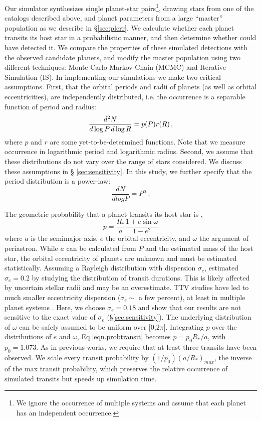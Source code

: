 Our simulator synthesizes single planet-star pairs\footnote{ We
  ignore the occurrence of multiple systems and assume that each
  planet has an independent occurrence.},  drawing stars from one of
the catalogs described above, and planet parameters from a large
``master'' population as we describe in \S \ref{sec:plerr}.  We calculate whether each
planet transits its host star in a probabilistic manner, and then determine
whether \kep{} could have detected it.  We compare the
properties of these simulated detections with the observed candidate \kep{}
planets, and modify the master population using two different
techniques: Monte Carlo Markov Chain (MCMC) and Iterative Simulation
(IS).  In implementing our simulations we make two critical
assumptions. First, that the orbital periods and radii of \kep{}
planets (as well as orbital eccentricities), are independently
distributed, i.e. the occurrence is a separable function of period and
radius:
\begin{equation}
{{d^2 N}\over{{d\log P \, d\log R}}} = p(P) r(R)\, ,
\label{eq:assumption}
\end{equation}
where $p$ and $r$ are some yet-to-be-determined functions. Note that
we measure occurrence in logarithmic period and logarithmic radius.
Second, we assume that these distributions do not vary over the range
of stars considered.  We discuss these assumptions in \S
\ref{sec:sensitivity}.  In this study, we further specify that the
  period distribution is a power-law:
\begin{equation}
\frac{dN}{d log P} = P^{\alpha}\, .
\label{eq:P}
\end{equation}


The geometric probability that a planet transits its host star is
\citep{Winn},
\begin{equation}
p = \frac{R_*}{a}\frac{1+e \sin \omega}{1-e^2}
\label{eqn.probtransit}
\end{equation}
where $a$ is the semimajor axis, $e$ the orbital eccentricity, and
$\omega$ the argument of periastron.  While $a$ can be calculated from
$P$ and the estimated mass of the host star, the orbital eccentricity
of \kep{} planets are unknown and must be estimated statistically.
Assuming a Rayleigh distribution with
  dispersion $\sigma_e$, \citet{Moorhead2011} estimated $\sigma_e =
0.2$ by studying the distribution of transit durations. This
  is likely affected by uncertain stellar radii and may be an
  overestimate. TTV studies have led to much smaller eccentricity
  dispersion ($\sigma_e \sim$ a few percent), at least in multiple
  planet systems \citep{WuLithwick,Hadden2014}. Here, we choose
$\sigma_e = 0.18$ and show that our results are not sensitive to the
exact value of $\sigma_e$ (\S \ref{sec:sensitivity}). 
The underlying distribution of $\omega$ can be safely assumed to be
uniform over [0,$2\pi$].  
Integrating $p$ over the distributions of $e$ and $\omega$,
Eq.\ref{eqn.probtransit} becomes $p = p_0 R_*/a$, with
$p_0=1.073$.  As in previous works, we require that at least three
transits have been observed. 
We scale every transit probability by $(1/p_0)(a/R_*)_{max}$, 
the inverse of the max transit probability, which preserves the relative 
occurrence of simulated transits but
speeds up simulation time.


